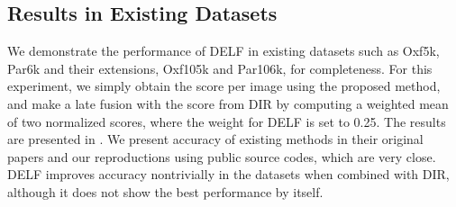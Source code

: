 \documentclass[10pt,twocolumn,letterpaper]{article}
\begin{document}
\subsection{Results in Existing Datasets}
\label{sub:results}
We demonstrate the performance of DELF in existing datasets such as Oxf5k, Par6k and their extensions, Oxf105k and Par106k, for completeness.
For this experiment, we simply obtain the score per image using the proposed method, and make a late fusion with the score from DIR by computing a weighted mean of two normalized scores, where the weight for DELF is set to 0.25.
The results are presented in .
We present accuracy of existing methods in their original papers and our reproductions using public source codes, which are very close.
DELF improves accuracy nontrivially in the datasets when combined with DIR, although it does not show the best performance by itself.
\end{document}
